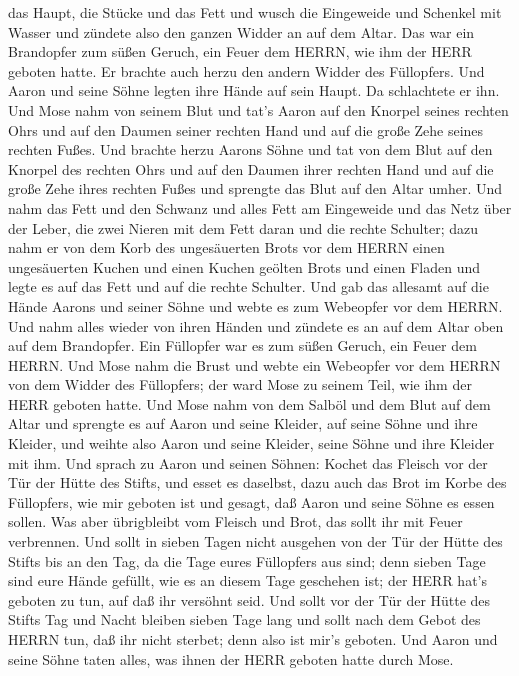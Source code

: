 das Haupt, die Stücke und das Fett  und wusch die
Eingeweide und Schenkel mit Wasser und zündete also den ganzen Widder an
auf dem Altar. Das war ein Brandopfer zum süßen Geruch, ein Feuer dem
HERRN, wie ihm der HERR geboten hatte.  Er brachte auch
herzu den andern Widder des Füllopfers. Und Aaron und seine Söhne legten
ihre Hände auf sein Haupt.  Da schlachtete er ihn. Und Mose
nahm von seinem Blut und tat's Aaron auf den Knorpel seines rechten Ohrs
und auf den Daumen seiner rechten Hand und auf die große Zehe seines
rechten Fußes.  Und brachte herzu Aarons Söhne und tat von
dem Blut auf den Knorpel des rechten Ohrs und auf den Daumen ihrer
rechten Hand und auf die große Zehe ihres rechten Fußes und sprengte das
Blut auf den Altar umher.  Und nahm das Fett und den
Schwanz und alles Fett am Eingeweide und das Netz über der Leber, die
zwei Nieren mit dem Fett daran und die rechte Schulter; 
dazu nahm er von dem Korb des ungesäuerten Brots vor dem HERRN einen
ungesäuerten Kuchen und einen Kuchen geölten Brots und einen Fladen und
legte es auf das Fett und auf die rechte Schulter.  Und gab
das allesamt auf die Hände Aarons und seiner Söhne und webte es zum
Webeopfer vor dem HERRN.  Und nahm alles wieder von ihren
Händen und zündete es an auf dem Altar oben auf dem Brandopfer. Ein
Füllopfer war es zum süßen Geruch, ein Feuer dem HERRN. 
Und Mose nahm die Brust und webte ein Webeopfer vor dem HERRN von dem
Widder des Füllopfers; der ward Mose zu seinem Teil, wie ihm der HERR
geboten hatte.  Und Mose nahm von dem Salböl und dem Blut
auf dem Altar und sprengte es auf Aaron und seine Kleider, auf seine
Söhne und ihre Kleider, und weihte also Aaron und seine Kleider, seine
Söhne und ihre Kleider mit ihm.  Und sprach zu Aaron und
seinen Söhnen: Kochet das Fleisch vor der Tür der Hütte des Stifts, und
esset es daselbst, dazu auch das Brot im Korbe des Füllopfers, wie mir
geboten ist und gesagt, daß Aaron und seine Söhne es essen sollen.
 Was aber übrigbleibt vom Fleisch und Brot, das sollt ihr
mit Feuer verbrennen.  Und sollt in sieben Tagen nicht
ausgehen von der Tür der Hütte des Stifts bis an den Tag, da die Tage
eures Füllopfers aus sind; denn sieben Tage sind eure Hände gefüllt,
 wie es an diesem Tage geschehen ist; der HERR hat's
geboten zu tun, auf daß ihr versöhnt seid.  Und sollt vor
der Tür der Hütte des Stifts Tag und Nacht bleiben sieben Tage lang und
sollt nach dem Gebot des HERRN tun, daß ihr nicht sterbet; denn also ist
mir's geboten.  Und Aaron und seine Söhne taten alles, was
ihnen der HERR geboten hatte durch Mose.


